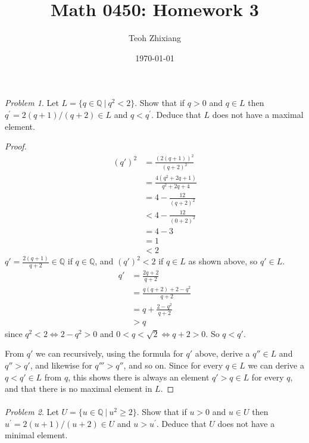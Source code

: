 \documentclass[11pt,twoside, reqno, align]{amsart}
\theoremstyle{remark}
\newtheorem{Prob}{Problem}
\def\Q{\mathbb Q}
\renewcommand{\iff}{\Leftrightarrow}
\begin{document}
\title{Math 0450: Homework 3}
\date{\today}
\author{Teoh Zhixiang}

\maketitle



\begin{Prob}
Let $L=\{q\in \Q~|~q^2<2\}$. Show that  if $q>0$ and $q\in L$ then $q^\prime=2(q+1)/(q+2)\in L$ and $q<q^\prime$. Deduce that $L$ does not have a maximal element.
\end{Prob}

\begin{proof}
\begin{align*}
    (q')^2 & = \frac{(2(q+1))^2}{(q+2)^2} \\
    & = \frac{4(q^2 + 2q + 1)}{q^2 + 2q + 4} \\
    & = 4 - \frac{12}{(q+2)^2} \\
    & < 4 - \frac{12}{(0+2)^2} \\
    & = 4 - 3 \\
    & = 1 \\
    & < 2
\end{align*}
$q'= \frac{2(q+1)}{q+2} \in \Q$ if $q \in \Q$, and $(q')^2 < 2$ if $q \in L$ as shown above, so $q' \in L$.
\begin{align*}
    q' & = \frac{2q+2}{q+2} \\
    & = \frac{q(q+2)+2-q^2}{q+2} \\
    & = q + \frac{2-q^2}{q+2} \\
    & > q
\end{align*}
since $q^2 < 2 \iff 2 - q^2 > 0$ and $0 < q < \sqrt{2} \iff q+2 > 0$. So $q < q'$.

From $q'$ we can recursively, using the formula for $q'$ above, derive a $q'' \in L$ and $q'' > q'$, and likewise for $q''' > q''$, and so on. Since for every $q \in L$ we can derive a $q < q' \in L$ from $q$, this shows there is always an element $q' > q \in L$ for every $q$, and that there is no maximal element in $L$.
\end{proof}

\paragraph{}

\begin{Prob}
Let $U=\{u\in \Q~|~u^2\geq 2\}$. Show that  if $u>0$ and $u\in U$ then $u^\prime=2(u+1)/(u+2)\in U$ and $u>u^\prime$. Deduce that $U$ does not have a minimal element.
\end{Prob}
\end{document}
